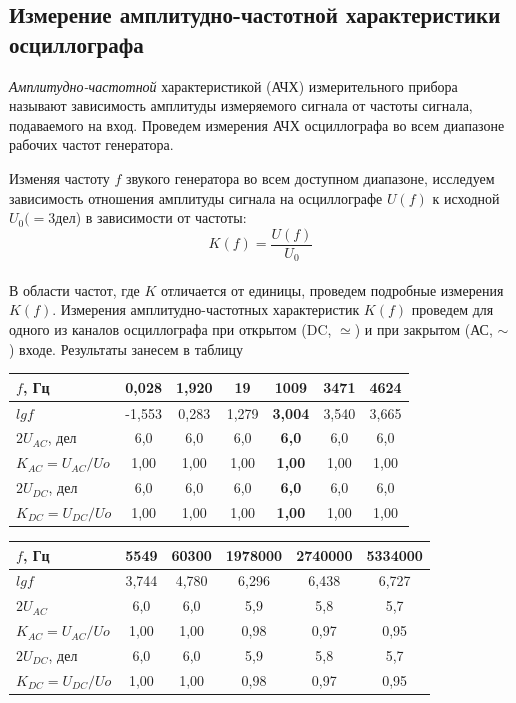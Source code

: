 \documentclass[a4paper,12pt]{article} %
\begin{document}
\subsection{Измерение амплитудно-частотной характеристики осциллографа}
\textit{Амплитудно-частотной} характеристикой (АЧХ) измерительного прибора называют зависимость амплитуды измеряемого сигнала от частоты сигнала, подаваемого на вход. Проведем измерения АЧХ  осциллографа во всем диапазоне рабочих частот генератора.

Изменяя частоту 	$f$ звукого генератора во всем доступном диапазоне, исследуем зависимость отношения амплитуды сигнала на осциллографе $U(f)$ к исходной $U_0(=3$дел) в зависимости от частоты:
\[K(f) = \frac{U(f)}{U_0}\]\\
В области частот, где $K$ отличается от единицы, проведем подробные измерения $K(f)$. Измерения амплитудно-частотных характеристик $K(f)$ проведем для одного из каналов осциллографа при открытом (DC, $\simeq $) и при закрытом (АС, $\sim $) входе. Результаты занесем в таблицу

\begin{table}[ht]
\begin{tabular}{|l|c|c|c|c|c|c|}
\hline
$f$, Гц        & 0,028  & 1,920 & 19    & \textbf{1009}  & 3471  & 4624  \\ \hline
$lg f$         & -1,553 & 0,283 & 1,279 & \textbf{3,004} & 3,540 & 3,665 \\ \hline
$2U_{AC}$, дел    & 6,0    & 6,0   & 6,0   & \textbf{6,0}   & 6,0   & 6,0   \\ \hline
$K_{AC} = U_{AC}/Uo$ & 1,00   & 1,00  & 1,00  & \textbf{1,00}  & 1,00  & 1,00  \\ \hline
$2U_{DC}$, дел    & 6,0    & 6,0   & 6,0   & \textbf{6,0}   & 6,0   & 6,0   \\ \hline
$K_{DC} = U_{DC}/Uo$ & 1,00   & 1,00  & 1,00  & \textbf{1,00}  & 1,00  & 1,00  \\ \hline
\end{tabular}

\end{table}

\begin{table}[h]
\begin{tabular}{|l|c|c|c|c|c|}
\hline
$f$, Гц     & 5549  & 60300 & 1978000 & 2740000 & 5334000 \\ \hline
$lg f$        & 3,744 & 4,780 & 6,296   & 6,438   & 6,727   \\ \hline
$2U_{AC}$   & 6,0   & 6,0   & 5,9     & 5,8     & 5,7     \\ \hline
$K_{AC} = U_{AC}/Uo$ & 1,00  & 1,00  & 0,98    & 0,97    & 0,95    \\ \hline
$2U_{DC}$, дел    & 6,0   & 6,0   & 5,9     & 5,8     & 5,7     \\ \hline
$K_{DC} = U_{DC}/Uo$ & 1,00  & 1,00  & 0,98    & 0,97    & 0,95    \\ \hline
\end{tabular}
\end{table}
\end{document}
